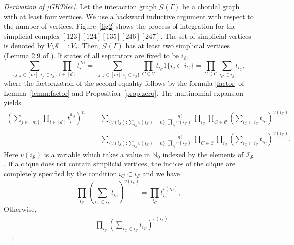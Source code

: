 \documentclass[a4paper,12pt]{article}
\theoremstyle{plain}
\theoremstyle{remark}
\begin{document}
\begin{proof}[Derivation of \eqref{GHTdec}]
  Let the interaction graph $\mathcal{G}(\Gamma)$ be a chordal
  graph with at least four vertices. We use a backward
  inductive argument with respect to the number of vertices.
  Figure~\ref{fig2} shows the process of integration for
  the simplicial complex $[123][124][135][246][247]$.
  The set of simplicial vertices is denoted by
  $V\setminus\mathcal{S}=:V_*$. Then, $\mathcal{G}(\Gamma)$
  has at least two simplicial vertices (Lemma 2.9 of \cite{Lau94}).
  If states of all separators are fixed to be $i_{\mathcal{S}}$,
  \begin{equation}
    \sum_{\{j:j\in[m],i_j{\subset} i_{\mathcal{S}}\}}
    \prod_{i\in[d]}t_i^{a_{ij}}
    =\sum_{\{j:j\in[m],i_j{\subset} i_{\mathcal{S}}\}}
    \prod_{C\in\mathcal{C}}t_{i_{C}}1\{{i_j\subset i_C}\}
    =\prod_{C\in\mathcal{C}}
    \sum_{i_C{\subset}i_{\mathcal{S}}}t_{i_{C}},
    \label{sumdec}
  \end{equation}
  where the factorization of the second equality follows by
  the formula \eqref{factor} of Lemma~\ref{lemm:factor}
  and Proposition~\ref{prop:zero}. The multinomial expansion
  yields
  \begin{align*}
    \left(\sum_{j\in[m]}\prod_{i\in[d]}t_i^{a_{ij}}\right)^n
    &=\sum_{\{v(i_{\mathcal{S}}):\sum_{i_{\mathcal{S}}} v(i_{\mathcal{S}})=n\}}
    \frac{n!}{\prod_{i_{\mathcal{S}}} v(i_{\mathcal{S}})!}
    \prod_{i_{\mathcal{S}}}\prod_{C\in\mathcal{C}}
    \left(\sum_{i_C{\subset} i_{\mathcal{S}}}t_{i_C}\right)^{v(i_{\mathcal{S}})}\\
    &=\sum_{\{v(i_{\mathcal{S}}):\sum_{i_{\mathcal{S}}} v(i_{\mathcal{S}})=n\}}
    \frac{n!}{\prod_{i_{\mathcal{S}}} v(i_{\mathcal{S}})!}
    \prod_{C\in\mathcal{C}}
    \prod_{i_{\mathcal{S}}}\left(\sum_{i_C{\subset} i_{\mathcal{S}}}
    t_{i_C}\right)^{v(i_{\mathcal{S}})}.
  \end{align*}
  Here $v(i_{\mathcal{S}})$ is a variable which takes a value in
  $\mathbb{N}_0$ indexed by the elements of $\mathcal{I}_{\mathcal{S}}$.
  If a clique does not contain simplicial vertices, the indices
  of the clique are completely specified by the condition
  $i_C{\subset} i_{\mathcal{S}}$ and we have
  \[
    \prod_{i_{\mathcal{S}}}\left(\sum_{i_C{\subset} i_{\mathcal{S}}}
    t_{i_C}\right)^{v(i_{\mathcal{S}})}=\prod_{i_C}t_{i_C}^{v(i_C)},
  \]
  Otherwise,
  \begin{align*}
    &\prod_{i_{\mathcal{S}}}\left(\sum_{i_C{\subset} i_{\mathcal{S}}}
    t_{i_C}\right)^{v(i_{\mathcal{S}})}

\end{align*}
\end{proof}
\end{document}
